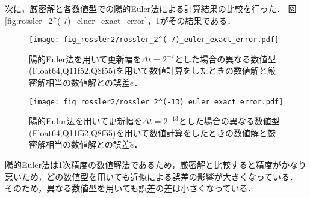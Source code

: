 次に，厳密解と各数値型での陽的Euler法による計算結果の比較を行った．
図\ref{fig:rossler_2^(-7)_eluer_exact_error}，\ref{fig:rossler_2^(-13)_euler_exact_error}がその結果である．\\
\begin{figure}[H]
    \centering
    \begin{minipage}[b]{0.48\columnwidth}
        \centering
        \texttt{[image: fig\_rossler2/rossler\_2^(-7)\_euler\_exact\_error.pdf]}
        \caption{陽的Euler法を用いて更新幅を$\Delta t = 2^{-7}$とした場合の異なる数値型(Float64,Q11f52,Q8f55)を用いて数値計算をしたときの数値解と厳密解相当の数値解との誤差$\tilde{e}$．}
        \label{fig:rossler_2^(-7)_eluer_exact_error}
    \end{minipage}
    \hspace{0.01\columnwidth}
    \begin{minipage}[b]{0.48\columnwidth}
        \centering
        \texttt{[image: fig\_rossler2/rossler\_2^(-13)\_euler\_exact\_error.pdf]}
        \caption{陽的Eulur法を用いて更新幅を$\Delta t =  2^{-13}$とした場合の異なる数値型(Float64,Q11f52,Q8f55)を用いて数値計算をしたときの数値解と厳密解相当の数値解との誤差$\tilde{e}$．}
        \label{fig:rossler_2^(-13)_euler_exact_error}
    \end{minipage}
\end{figure}
陽的Euler法は1次精度の数値解法であるため，厳密解と比較すると精度がかなり悪いため，どの数値型を用いても近似による誤差の影響が大きくなっている．
そのため，異なる数値型を用いても誤差の差は小さくなっている．

